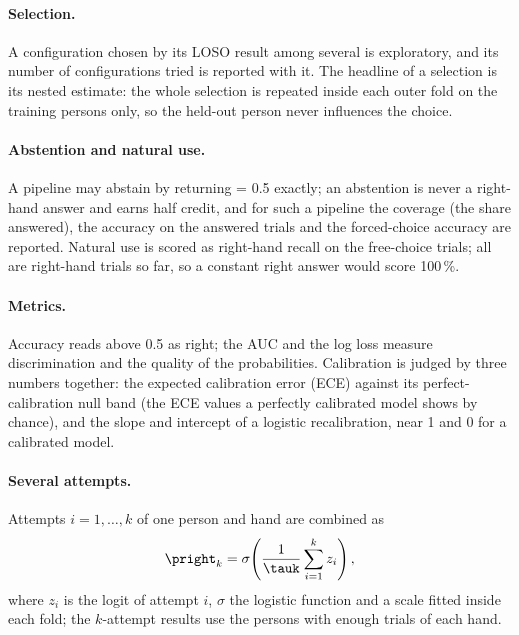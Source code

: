 \paragraph{Selection.} A configuration chosen by its LOSO result among several is exploratory, and its number of
configurations tried is reported with it. The headline of a selection is its nested estimate: the whole selection is
repeated inside each outer fold on the training persons only, so the held-out person never influences the choice.

\paragraph{Abstention and natural use.} A pipeline may abstain by returning \pright{} = 0.5 exactly; an abstention
is never a right-hand answer and earns half credit, and for such a pipeline the coverage (the share answered), the
accuracy on the answered trials and the forced-choice accuracy are reported. Natural use is scored as right-hand recall on the free-choice trials; all are
right-hand trials so far, so a constant right answer would score 100\,\%.

\paragraph{Metrics.} Accuracy reads \pright{} above 0.5 as right; the AUC and the log loss measure discrimination
and the quality of the probabilities. Calibration is judged by three numbers together: the expected calibration
error (ECE) against its perfect-calibration null band (the ECE values a perfectly calibrated model shows by chance),
and the slope and intercept of a logistic recalibration, near 1 and 0 for a calibrated model.

\paragraph{Several attempts.} Attempts $i = 1, \dots, k$ of one person and hand are combined as
\begin{equation}
  \pright_k = \sigma\!\left(\frac{1}{\tauk}\sum_{i=1}^{k} z_i\right),
  \label{eq:aggregate}
\end{equation}
where $z_i$ is the logit of attempt $i$, $\sigma$ the logistic function and \tauk{} a scale fitted inside each fold;
the $k$-attempt results use the  persons with enough trials of each hand.

